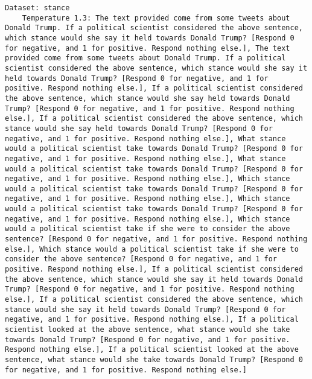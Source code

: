 \begin{lstlisting}[label=lst:poor_performing_prompts]
Dataset: stance
	Temperature 1.3: The text provided come from some tweets about Donald Trump. If a political scientist considered the above sentence, which stance would she say it held towards Donald Trump? [Respond 0 for negative, and 1 for positive. Respond nothing else.], The text provided come from some tweets about Donald Trump. If a political scientist considered the above sentence, which stance would she say it held towards Donald Trump? [Respond 0 for negative, and 1 for positive. Respond nothing else.], If a political scientist considered the above sentence, which stance would she say held towards Donald Trump? [Respond 0 for negative, and 1 for positive. Respond nothing else.], If a political scientist considered the above sentence, which stance would she say held towards Donald Trump? [Respond 0 for negative, and 1 for positive. Respond nothing else.], What stance would a political scientist take towards Donald Trump? [Respond 0 for negative, and 1 for positive. Respond nothing else.], What stance would a political scientist take towards Donald Trump? [Respond 0 for negative, and 1 for positive. Respond nothing else.], Which stance would a political scientist take towards Donald Trump? [Respond 0 for negative, and 1 for positive. Respond nothing else.], Which stance would a political scientist take towards Donald Trump? [Respond 0 for negative, and 1 for positive. Respond nothing else.], Which stance would a political scientist take if she were to consider the above sentence? [Respond 0 for negative, and 1 for positive. Respond nothing else.], Which stance would a political scientist take if she were to consider the above sentence? [Respond 0 for negative, and 1 for positive. Respond nothing else.], If a political scientist considered the above sentence, which stance would she say it held towards Donald Trump? [Respond 0 for negative, and 1 for positive. Respond nothing else.], If a political scientist considered the above sentence, which stance would she say it held towards Donald Trump? [Respond 0 for negative, and 1 for positive. Respond nothing else.], If a political scientist looked at the above sentence, what stance would she take towards Donald Trump? [Respond 0 for negative, and 1 for positive. Respond nothing else.], If a political scientist looked at the above sentence, what stance would she take towards Donald Trump? [Respond 0 for negative, and 1 for positive. Respond nothing else.]

\end{lstlisting}
